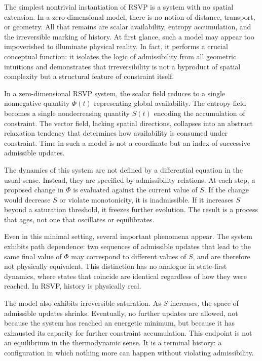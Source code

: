 \documentclass[11pt,oneside]{book}
\begin{document}
The simplest nontrivial instantiation of RSVP is a system with no spatial extension. In a zero-dimensional model, there is no notion of distance, transport, or geometry. All that remains are scalar availability, entropy accumulation, and the irreversible marking of history. At first glance, such a model may appear too impoverished to illuminate physical reality. In fact, it performs a crucial conceptual function: it isolates the logic of admissibility from all geometric intuitions and demonstrates that irreversibility is not a byproduct of spatial complexity but a structural feature of constraint itself.

In a zero-dimensional RSVP system, the scalar field reduces to a single nonnegative quantity \(\Phi(t)\) representing global availability. The entropy field becomes a single nondecreasing quantity \(S(t)\) encoding the accumulation of constraint. The vector field, lacking spatial directions, collapses into an abstract relaxation tendency that determines how availability is consumed under constraint. Time in such a model is not a coordinate but an index of successive admissible updates.

The dynamics of this system are not defined by a differential equation in the usual sense. Instead, they are specified by admissibility relations. At each step, a proposed change in \(\Phi\) is evaluated against the current value of \(S\). If the change would decrease \(S\) or violate monotonicity, it is inadmissible. If it increases \(S\) beyond a saturation threshold, it freezes further evolution. The result is a process that ages, not one that oscillates or equilibrates.

Even in this minimal setting, several important phenomena appear. The system exhibits path dependence: two sequences of admissible updates that lead to the same final value of \(\Phi\) may correspond to different values of \(S\), and are therefore not physically equivalent. This distinction has no analogue in state-first dynamics, where states that coincide are identical regardless of how they were reached. In RSVP, history is physically real.

The model also exhibits irreversible saturation. As \(S\) increases, the space of admissible updates shrinks. Eventually, no further updates are allowed, not because the system has reached an energetic minimum, but because it has exhausted its capacity for further constraint accumulation. This endpoint is not an equilibrium in the thermodynamic sense. It is a terminal history: a configuration in which nothing more can happen without violating admissibility.
\end{document}
